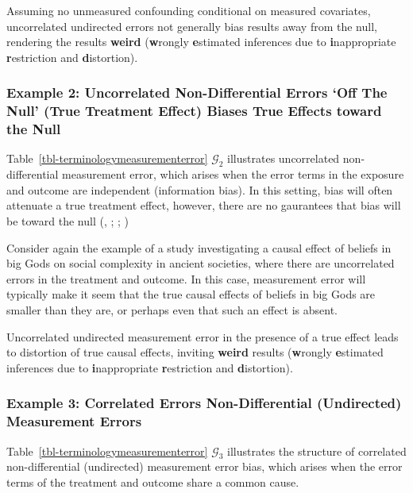 \documentclass[
  single column]{article}
\begin{document}
Assuming no unmeasured confounding conditional on measured covariates,
uncorrelated undirected errors not generally bias results away from the
null, rendering the results \textbf{weird} (\textbf{w}rongly
\textbf{e}stimated inferences due to \textbf{i}nappropriate
\textbf{r}estriction and \textbf{d}istortion).

\subsubsection{Example 2: Uncorrelated Non-Differential Errors `Off The
Null' (True Treatment Effect) Biases True Effects toward the
Null}\label{example-2-uncorrelated-non-differential-errors-off-the-null-true-treatment-effect-biases-true-effects-toward-the-null}

Table~\ref{tbl-terminologymeasurementerror} \(\mathcal{G}_2\)
illustrates uncorrelated non-differential measurement error, which
arises when the error terms in the exposure and outcome are independent
(information bias). In this setting, bias will often attenuate a true
treatment effect, however, there are no gaurantees that bias will be
toward the null (, ;
;
)

Consider again the example of a study investigating a causal effect of
beliefs in big Gods on social complexity in ancient societies, where
there are uncorrelated errors in the treatment and outcome. In this
case, measurement error will typically make it seem that the true causal
effects of beliefs in big Gods are smaller than they are, or perhaps
even that such an effect is absent.

Uncorrelated undirected measurement error in the presence of a true
effect leads to distortion of true causal effects, inviting
\textbf{weird} results (\textbf{w}rongly \textbf{e}stimated inferences
due to \textbf{i}nappropriate \textbf{r}estriction and
\textbf{d}istortion).

\subsubsection{Example 3: Correlated Errors Non-Differential
(Undirected) Measurement
Errors}\label{example-3-correlated-errors-non-differential-undirected-measurement-errors}

Table~\ref{tbl-terminologymeasurementerror} \(\mathcal{G}_3\)
illustrates the structure of correlated non-differential (undirected)
measurement error bias, which arises when the error terms of the
treatment and outcome share a common cause.
\end{document}
